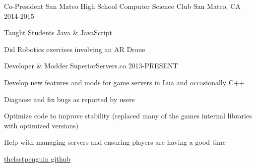 \begin{cventries}
  \cventry
    {Co-President}
    {San Mateo High School Computer Science Club}
    {San Mateo, CA}
    {2014-2015}
    {
      \begin{cvitems}
        \item {Taught Students Java \& JavaScript}
        \item {Did Robotics exercises involving an AR Drone}
      \end{cvitems}
    }
  \cventry
    {Developer \& Modder}
    {SuperiorServers.co}
    {}
    {2013-PRESENT}
    {
      \begin{cvitems}
        \item {Develop new features and mods for game servers in Lua and occasionally C++}
        \item {Diagnose and fix bugs as reported by users}
        \item {Optimize code to improve stability (replaced many of the games internal libraries with optimized versions)}
        \item {Help with managing servers and ensuring players are having a good time}
        \item \href{https://github.com/thelastpenguin?tab=repositories}{thelastpenguin github}
      \end{cvitems}
    }
\end{cventries}
